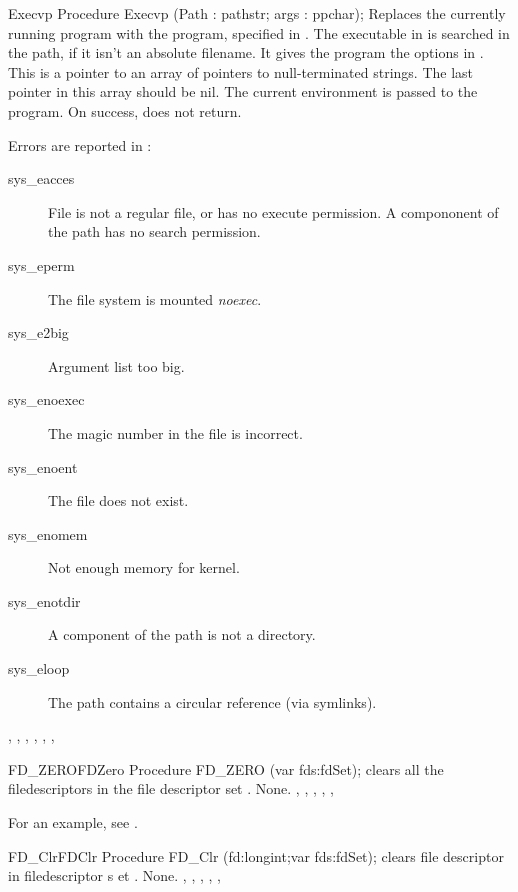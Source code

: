 \begin{procedure}{Execvp}
\Declaration
Procedure Execvp (Path : pathstr; args : ppchar);
\Description
Replaces the currently running program with the program, specified in
. The executable in  is searched in the path, if it isn't
an absolute filename.
It gives the program the options in . This is a pointer to an array of pointers to null-terminated
strings. The last pointer in this array should be nil.
The current environment is passed to the program.
On success,  does not return.

\Errors
Errors are reported in :
\begin{description}
\item[sys\_eacces] File is not a regular file, or has no execute permission.
A compononent of the path has no search permission.
\item[sys\_eperm] The file system is mounted \textit{noexec}.
\item[sys\_e2big] Argument list too big.
\item[sys\_enoexec] The magic number in the file is incorrect.
\item[sys\_enoent] The file does not exist.
\item[sys\_enomem] Not enough memory for kernel.
\item[sys\_enotdir] A component of the path is not a directory.
\item[sys\_eloop] The path contains a circular reference (via symlinks).
\end{description}
\SeeAlso
{}, , ,
, , ,  
\end{procedure}



\begin{procedurel}{FD\_ZERO}{FDZero}
\Declaration
Procedure FD\_ZERO (var fds:fdSet);
\Description
{} clears all the filedescriptors in the file descriptor 
set .
\Errors
None.
\SeeAlso
{}, 
, 
, 
,
, 

\end{procedurel}
For an example, see .

\begin{procedurel}{FD\_Clr}{FDClr}
\Declaration
Procedure FD\_Clr (fd:longint;var fds:fdSet);
\Description
  clears file descriptor  in filedescriptor s
  et .
\Errors
None.
\SeeAlso
{}, 
, 
,
, 
, 
\end{procedurel}

